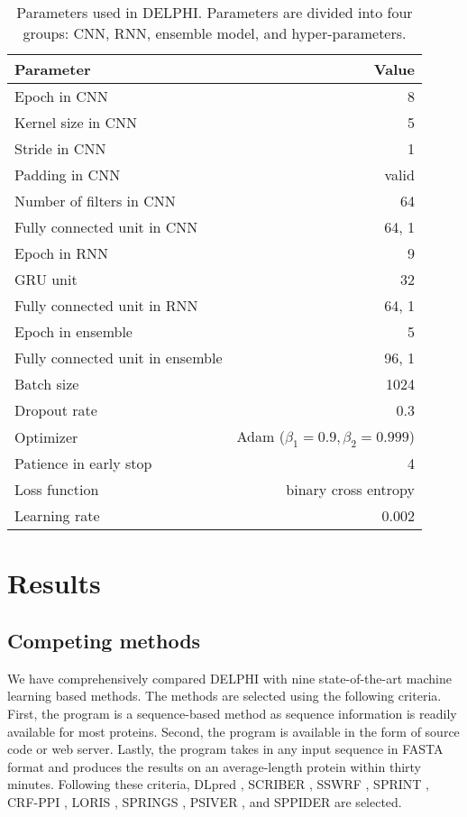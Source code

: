 \documentclass{bioinfo}
\begin{document}
\begin{methods}
\begin{table}[htbp]
  \centering
  \caption{Parameters used in DELPHI. Parameters are divided into four groups: CNN, RNN, ensemble model, and hyper-parameters.}
    \begin{tabular}{lr}
    Parameter & Value \\
    \midrule
    \midrule
    Epoch in CNN & 8 \\
    Kernel size in CNN & 5 \\
    Stride in CNN & 1 \\
    Padding in CNN & valid \\
    Number of filters in CNN & 64 \\
    Fully connected unit in CNN & 64, 1 \\
    \midrule
    Epoch in RNN & 9 \\
    GRU unit & 32 \\
    Fully connected unit in RNN & 64, 1 \\
    \midrule
    Epoch in ensemble & 5 \\
    Fully connected unit in ensemble & 96, 1 \\
    \midrule
    Batch size & 1024 \\
    Dropout rate & 0.3 \\
    Optimizer & Adam ($\beta_1=0.9, \beta_2=0.999$) \\
    Patience in early stop & 4 \\
    Loss function & binary cross entropy \\
    Learning rate & 0.002 \\
    \bottomrule
    \end{tabular}%
  \label{tab_parameter}%
\end{table}%

\end{methods}

\section{Results}
\subsection{Competing methods}
We have comprehensively compared DELPHI with nine state-of-the-art machine learning based methods. The methods are selected using the following criteria. First, the program is a sequence-based method as sequence information is readily available for most proteins. Second, the program is available in the form of source code or web server. Lastly, the program takes in any input sequence in FASTA format and produces the results on an average-length protein within thirty minutes. Following these criteria, DLpred \citep{zhang2019sequence}, SCRIBER \citep{zhang2019scriber}, SSWRF \citep{wei2016protein}, SPRINT \citep{taherzadeh2016sequence}, CRF-PPI \citep{wei2015cascade}, LORIS \citep{dhole2014sequence}, SPRINGS \citep{singh2014springs}, PSIVER \citep{murakami2010applying}, and SPPIDER \citep{porollo2007prediction} are selected.
\end{document}
